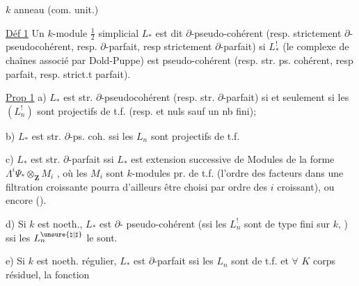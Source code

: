 $k$ anneau (com. unit.)

\uline{Déf 1} Un $k$-module $\frac12$ simplicial $L_*$ est dit
$\partial$-pseudo-cohérent (resp. strictement $\partial$-pseudocohérent,
resp. $\partial$-parfait, resp strictement $\partial$-parfait)
si $L^!_*$ (le complexe de chaînes associé
par Dold-Puppe) est pseudo-cohérent
(resp. str. ps. cohérent, resp parfait, resp.
strict.t parfait).

\uline{Prop 1} a) $L_*$ est str. $\partial$-pseudocohérent
(resp. str. $\partial$-parfait) si et seulement si les
$(L^!_n)$ sont projectifs de t.f. (resp. et
nuls sauf un nb fini); 

b) $L_*$ est str. $\partial$-ps. coh. ssi les $L_n$
sont projectifs de t.f.

c) $L_*$ est str. $\partial$-parfait ssi $L_*$ est
extension successive  de Modules de
la forme $\Lambda^i\Psi_*\otimes_{\mathbf Z}M_i$
, où les
$M_i$ sont $k$-modules pr. de t.f.
(l'ordre des facteurs dans une filtration
croissante  pourra d'ailleurs
être choisi par ordre des $i$
croissant), ou encore 
().

d) Si $k$ est noeth., $L_*$ est $\partial$-
pseudo-cohérent (ssi les $L^!_n$ sont
de type fini sur $k$, ) ssi
les $L^{\unsure{\natural|\sharp}}_n$ le sont.

e) Si $k$ est noeth. régulier, $L_*$ est
$\partial$-parfait ssi les $L_n$ sont de t.f.
et  $\forall$ $K$ corps résiduel, la fonction
